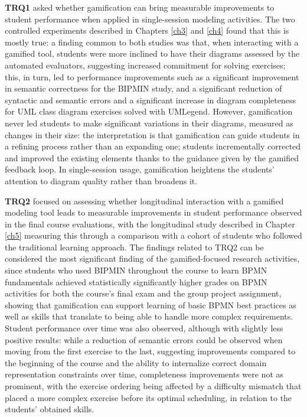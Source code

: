 \textbf{TRQ1} asked whether gamification can bring measurable improvements to student performance when applied in single-session modeling activities. The two controlled experiments described in Chapters \ref{ch3} and \ref{ch4} found that this is mostly true: a finding common to both studies was that, when interacting with a gamified tool, students were more inclined to have their diagrams assessed by the automated evaluators, suggesting increased commitment for solving exercises; this, in turn, led to performance improvements such as a significant improvement in semantic correctness for the BIPMIN study, and a significant reduction of syntactic and semantic errors and a significant increase in diagram completeness for UML class diagram exercises solved with UMLegend. However, gamification never led students to make significant variations in their diagrams, measured as changes in their size: the interpretation is that gamification can guide students in a refining process rather than an expanding one; students incrementally corrected and improved the existing elements thanks to the guidance given by the gamified feedback loop. In single-session usage, gamification heightens the students' attention to diagram quality rather than broadens it.

\textbf{TRQ2} focused on assessing whether longitudinal interaction with a gamified modeling tool leads to measurable improvements in student performance observed in the final course evaluations, with the longitudinal study described in Chapter \ref{ch5} measuring this through a comparison with a cohort of students who followed the traditional learning approach. The findings related to TRQ2 can be considered the most significant finding of the gamified-focused research activities, since students who used BIPMIN throughout the course to learn BPMN fundamentals achieved statistically significantly higher grades on BPMN activities for both the course's final exam and the group project assignment, showing that gamification can support learning of basic BPMN best practices as well as skills that translate to being able to handle more complex requirements. Student performance over time was also observed, although with slightly less positive results: while a reduction of semantic errors could be observed when moving from the first exercise to the last, suggesting improvements compared to the beginning of the course and the ability to internalize correct domain representation constraints over time, completeness improvements were not as prominent, with the exercise ordering being affected by a difficulty mismatch that placed a more complex exercise before its optimal scheduling, in relation to the students' obtained skills.

